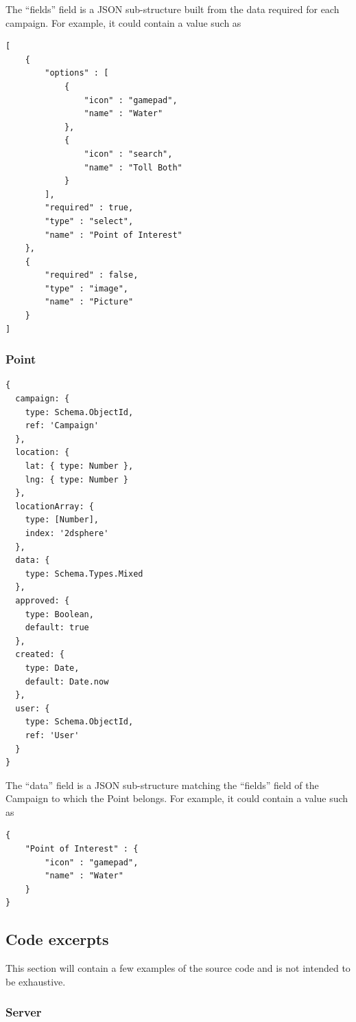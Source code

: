 \documentclass{article}
\begin{document}
		The ``fields'' field is a JSON sub-structure built from the data required for each campaign. For example, it could contain a value such as

		\begin{verbatim}
[
    {
        "options" : [ 
            {
                "icon" : "gamepad",
                "name" : "Water"
            }, 
            {
                "icon" : "search",
                "name" : "Toll Both"
            }
        ],
        "required" : true,
        "type" : "select",
        "name" : "Point of Interest"
    },
    {
        "required" : false,
        "type" : "image",
        "name" : "Picture"
    }
]
		\end{verbatim}

		\subsubsection{Point}

		\begin{verbatim}
{
  campaign: {
    type: Schema.ObjectId,
    ref: 'Campaign'
  },
  location: {
    lat: { type: Number },
    lng: { type: Number }
  },
  locationArray: {
    type: [Number],
    index: '2dsphere'
  },
  data: {
    type: Schema.Types.Mixed
  },
  approved: {
    type: Boolean,
    default: true
  },
  created: {
    type: Date,
    default: Date.now
  },
  user: {
    type: Schema.ObjectId,
    ref: 'User'
  }
}
		\end{verbatim}

		The ``data'' field is a JSON sub-structure matching the ``fields'' field of the Campaign to which the Point belongs. For example, it could contain a value such as

		\begin{verbatim}
{
    "Point of Interest" : {
        "icon" : "gamepad",
        "name" : "Water"
    }
}
		\end{verbatim}

		\subsection{Code excerpts}

		This section will contain a few examples of the source code and is not intended to be exhaustive.

		\subsubsection{Server}
\end{document}
